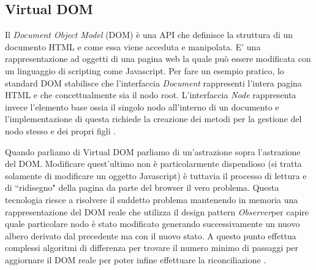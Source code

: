 \subsection{Virtual DOM}
Il  \textit{Document Object Model} (DOM) è una API che definisce la struttura di un documento HTML e come essa viene acceduta e manipolata. E' una rappresentazione ad oggetti di una pagina web la quale può essere modificata con un linguaggio di scripting come Javascript.
Per fare un esempio pratico, lo standard DOM stabilisce che l'interfaccia \textit{Document} rappresenti l'intera pagina HTML e che concettualmente sia il nodo root. L'interfaccia \textit{Node} rappresenta invece l'elemento base ossia il singolo nodo all'interno di un documento e l'implementazione di questa richiede la creazione dei metodi per la gestione del nodo stesso e dei propri figli \cite{HWRWhatIsDOM}.

Quando parliamo di Virtual DOM parliamo di un'astrazione sopra l'astrazione del DOM. Modificare quest'ultimo non è particolarmente dispendioso (si tratta solamente di modificare un oggetto Javascript) è tuttavia il processo di lettura e di “ridisegno" della pagina da parte del browser il vero problema. Questa tecnologia riesce a risolvere il suddetto problema mantenendo in memoria una rappresentazione del DOM reale che utilizza il design pattern \textit{Observer}\footnotemark per capire quale particolare nodo è stato modificato generando successivamente un nuovo albero derivato dal precedente ma con il nuovo stato. A questo punto effettua complessi algoritmi di differenza per trovare il numero minimo di passaggi per aggiornare il DOM reale per poter infine effettuare la riconciliazione \cite{MishraOnVirtualDOM}.


